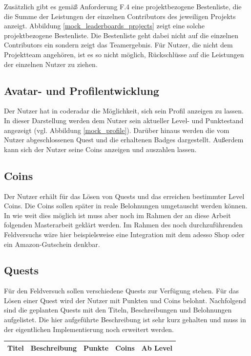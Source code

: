 \documentclass[
	oneside,  %
	ngerman, 
	final, 
	11pt, 
	a4paper, 
	1.1headlines, 
	headinclude=false, 
	footinclude=false, 
	mpinclude=false, 
	pagesize, 
	onecolumn, 
	titlepage, 
	parskip=half, 
	headsepline, 
	chapterprefix=false, 
	version=first, 
	listof=totoc, 
	bibliography=totoc, 
	toc=graduated, 
	fleqn
]{scrbook}
\begin{document}
Zusätzlich gibt es gemäß Anforderung F.4 eine projektbezogene Bestenliste, die die Summe der Leistungen der einzelnen Contributors des jeweiligen Projekts anzeigt.
Abbildung \ref{mock_leaderboards_projects} zeigt eine solche projektbezogene Bestenliste.
Die Bestenliste geht dabei nicht auf die einzelnen Contributors ein sondern zeigt das Teamergebnis.
Für Nutzer, die nicht dem Projektteam angehören, ist es so nicht möglich, Rückschlüsse auf die Leistungen der einzelnen Nutzer zu ziehen.

\subsection{Avatar- und Profilentwicklung}
\label{coderadar_Profil}
Der Nutzer hat in coderadar die Möglichkeit, sich sein Profil anzeigen zu lassen.
In dieser Darstellung werden dem Nutzer sein aktueller Level- und Punktestand angezeigt (vgl. Abbildung \ref{mock_profile}).
Darüber hinaus werden die vom Nutzer abgeschlossenen Quest und die erhaltenen Badges dargestellt.
Außerdem kann sich der Nutzer seine Coins anzeigen und auszahlen lassen.

\subsection{Coins}
\label{coderadar_Coins}
Der Nutzer erhält für das Lösen von Quests und das erreichen bestimmter Level Coins.
Die Coins sollen später in reale Belohnungen umgetauscht werden können.
In wie weit dies möglich ist muss aber noch im Rahmen der an diese Arbeit folgenden Masterarbeit geklärt werden.
Im Rahmen des noch durchzuführenden Feldversuchs wäre hier beispielsweise eine Integration mit dem adesso Shop oder ein Amazon-Gutschein denkbar.

\subsection{Quests}
\label{coderadar_Quests}
Für den Feldversuch sollen verschiedene Quests zur Verfügung stehen.
Für das Lösen einer Quest wird der Nutzer mit Punkten und Coins belohnt.
Nachfolgend sind die geplanten Quests mit den Titeln, Beschreibungen und Belohnungen aufgelistet.
Die hier aufgeführte Beschreibung ist sehr kurz gehalten und muss in der eigentlichen Implementierung noch erweitert werden.

\begin{center}
	\begin{tabular}{|c|c|c|c|c|}
		\hline
		Titel & Beschreibung & Punkte & Coins & Ab Level \\ \hline
		
	\end{tabular}
\end{center}
\end{document}

